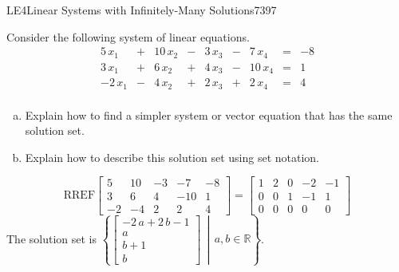 \begin{exercise}{LE4}{Linear Systems with Infinitely-Many Solutions}{7397} 
\begin{exerciseStatement} 

 Consider the following system of linear equations. \[
        \begin{matrix}
 5 \, x_{1} &  +  & 10 \, x_{2} &  -  & 3 \, x_{3} &  -  & 7 \, x_{4} & = & -8 \\
 3 \, x_{1} &  +  & 6 \, x_{2} &  +  & 4 \, x_{3} &  -  & 10 \, x_{4} & = & 1 \\
 -2 \, x_{1} &  -  & 4 \, x_{2} &  +  & 2 \, x_{3} &  +  & 2 \, x_{4} & = & 4 \\
 \end{matrix}    
      \] 

 

\begin{enumerate}[(a)]
\item  

 Explain how to find a simpler system or vector equation that has the same solution set. 

 
\item  

 Explain how to describe this solution set using set notation. 

 
\end{enumerate}

     \end{exerciseStatement}
 \begin{exerciseAnswer} 

 \[\mathrm{RREF}\left[\begin{array}{cccc|c}
5 & 10 & -3 & -7 & -8 \\
3 & 6 & 4 & -10 & 1 \\
-2 & -4 & 2 & 2 & 4
\end{array}\right]=\left[\begin{array}{cccc|c}
1 & 2 & 0 & -2 & -1 \\
0 & 0 & 1 & -1 & 1 \\
0 & 0 & 0 & 0 & 0
\end{array}\right]\] The solution set is \( \left\{ \left[\begin{array}{c}
-2 \, a + 2 \, b - 1 \\
a \\
b + 1 \\
b
\end{array}\right] \,\middle|\, a,b \in\mathbb R \right\} \). 

 \end{exerciseAnswer}
 \end{exercise}


